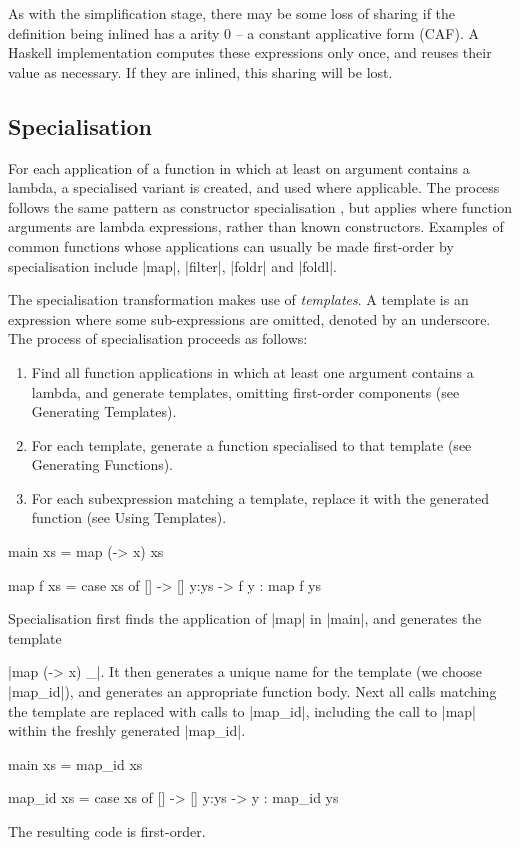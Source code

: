 As with the simplification stage, there may be some loss of sharing if the definition being inlined has a arity 0 -- a constant applicative form (CAF). A Haskell implementation computes these expressions only once, and reuses their value as necessary. If they are inlined, this sharing will be lost.

\subsection{Specialisation}

For each application of a function in which at least on argument contains a lambda, a specialised variant is created, and used where applicable. The process follows the same pattern as constructor specialisation \cite{spj:specconstr}, but applies where function arguments are lambda expressions, rather than known constructors. Examples of common functions whose applications can usually be made first-order by specialisation include |map|, |filter|, |foldr| and |foldl|.

The specialisation transformation makes use of \textit{templates}. A template is an expression where some sub-expressions are omitted, denoted by an underscore. The process of specialisation proceeds as follows:

\begin{enumerate}
\item Find all function applications in which at least one argument contains a lambda, and generate templates, omitting first-order components (see Generating Templates).
\item For each template, generate a function specialised to that template (see Generating Functions).
\item For each subexpression matching a template, replace it with the generated function (see Using Templates).
\end{enumerate}

\begin{example}
\label{exF:map_id}
\begin{code}
main xs = map (\x -> x) xs

map f xs = case  xs of
                 []    -> []
                 y:ys  -> f y : map f ys
\end{code}

Specialisation first finds the application of |map| in |main|, and generates the template \ignore|map (\x -> x) _|. It then generates a unique name for the template (we choose |map_id|), and generates an appropriate function body. Next all calls matching the template are replaced with calls to |map_id|, including the call to |map| within the freshly generated |map_id|.

\begin{code}
main xs = map_id xs

map_id xs = case  xs of
                  []    -> []
                  y:ys  -> y : map_id ys
\end{code}

\noindent The resulting code is first-order.
\end{example}

